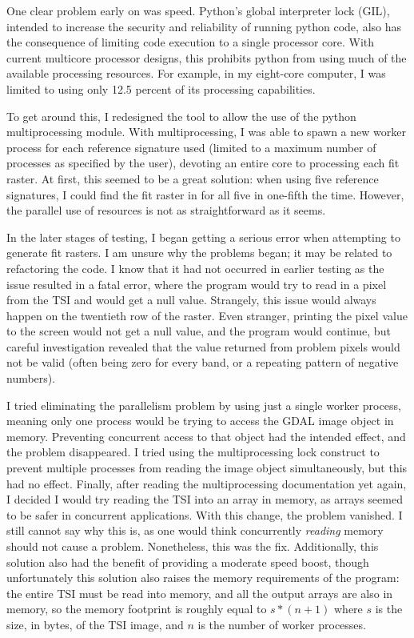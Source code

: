 One clear problem early on was speed. Python’s global interpreter lock (GIL), intended to increase the security and reliability of running python code, also has the consequence of limiting code execution to a single processor core. With current multicore processor designs, this prohibits python from using much of the available processing resources. For example, in my eight-core computer, I was limited to using only 12.5 percent of its processing capabilities.

To get around this, I redesigned the tool to allow the use of the python multiprocessing module. With multiprocessing, I was able to spawn a new worker process for each reference signature used (limited to a maximum number of processes as specified by the user), devoting an entire core to processing each fit raster. At first, this seemed to be a great solution: when using five reference signatures, I could find the fit raster in for all five in one-fifth the time. However, the parallel use of resources is not as straightforward as it seems.

In the later stages of testing, I began getting a serious error when attempting to generate fit rasters. I am unsure why the problems began; it may be related to refactoring the code. I know that it had not occurred in earlier testing as the issue resulted in a fatal error, where the program would try to read in a pixel from the TSI and would get a null value. Strangely, this issue would always happen on the twentieth row of the raster. Even stranger, printing the pixel value to the screen would not get a null value, and the program would continue, but careful investigation revealed that the value returned from problem pixels would not be valid (often being zero for every band, or a repeating pattern of negative numbers).

I tried eliminating the parallelism problem by using just a single worker process, meaning only one process would be trying to access the GDAL image object in memory. Preventing concurrent access to that object had the intended effect, and the problem disappeared. I tried using the multiprocessing lock construct to prevent multiple processes from reading the image object simultaneously, but this had no effect. Finally, after reading the multiprocessing documentation yet again, I decided I would try reading the TSI into an array in memory, as arrays seemed to be safer in concurrent applications. With this change, the problem vanished. I still cannot say why this is, as one would think concurrently \textit{reading} memory should not cause a problem. Nonetheless, this was the fix. Additionally, this solution also had the benefit of providing a moderate speed boost, though unfortunately this solution also raises the memory requirements of the program: the entire TSI must be read into memory, and all the output arrays are also in memory, so the memory footprint is roughly equal to $s * (n + 1)$ where $s$ is the size, in bytes, of the TSI image, and $n$ is the number of worker processes.


